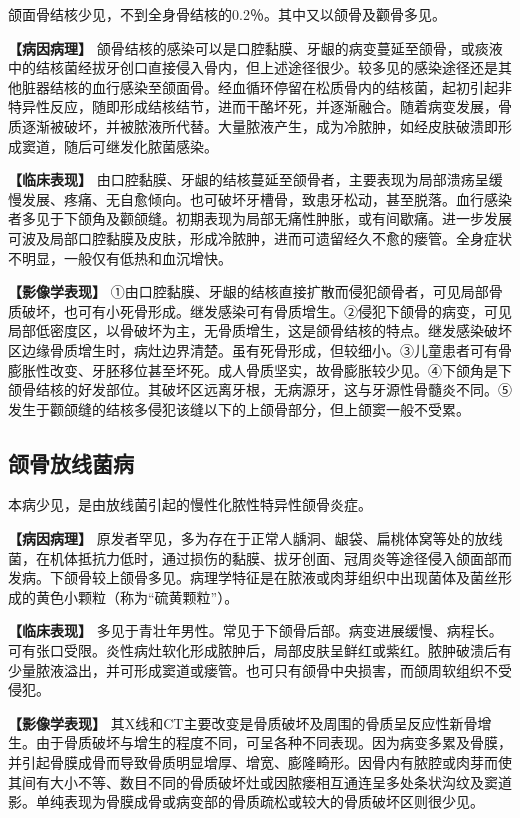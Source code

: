 颌面骨结核少见，不到全身骨结核的0.2％。其中又以颌骨及颧骨多见。

\textbf{【病因病理】}
颌骨结核的感染可以是口腔黏膜、牙龈的病变蔓延至颌骨，或痰液中的结核菌经拔牙创口直接侵入骨内，但上述途径很少。较多见的感染途径还是其他脏器结核的血行感染至颌面骨。经血循环停留在松质骨内的结核菌，起初引起非特异性反应，随即形成结核结节，进而干酪坏死，并逐渐融合。随着病变发展，骨质逐渐被破坏，并被脓液所代替。大量脓液产生，成为冷脓肿，如经皮肤破溃即形成窦道，随后可继发化脓菌感染。

\textbf{【临床表现】}
由口腔黏膜、牙龈的结核蔓延至颌骨者，主要表现为局部溃疡呈缓慢发展、疼痛、无自愈倾向。也可破坏牙槽骨，致患牙松动，甚至脱落。血行感染者多见于下颌角及颧颌缝。初期表现为局部无痛性肿胀，或有间歇痛。进一步发展可波及局部口腔黏膜及皮肤，形成冷脓肿，进而可遗留经久不愈的瘘管。全身症状不明显，一般仅有低热和血沉增快。

\textbf{【影像学表现】}
①由口腔黏膜、牙龈的结核直接扩散而侵犯颌骨者，可见局部骨质破坏，也可有小死骨形成。继发感染可有骨质增生。②侵犯下颌骨的病变，可见局部低密度区，以骨破坏为主，无骨质增生，这是颌骨结核的特点。继发感染破坏区边缘骨质增生时，病灶边界清楚。虽有死骨形成，但较细小。③儿童患者可有骨膨胀性改变、牙胚移位甚至坏死。成人骨质坚实，故骨膨胀较少见。④下颌角是下颌骨结核的好发部位。其破坏区远离牙根，无病源牙，这与牙源性骨髓炎不同。⑤发生于颧颌缝的结核多侵犯该缝以下的上颌骨部分，但上颌窦一般不受累。

\subsection{颌骨放线菌病}

本病少见，是由放线菌引起的慢性化脓性特异性颌骨炎症。

\textbf{【病因病理】}
原发者罕见，多为存在于正常人龋洞、龈袋、扁桃体窝等处的放线菌，在机体抵抗力低时，通过损伤的黏膜、拔牙创面、冠周炎等途径侵入颌面部而发病。下颌骨较上颌骨多见。病理学特征是在脓液或肉芽组织中出现菌体及菌丝形成的黄色小颗粒（称为“硫黄颗粒”）。

\textbf{【临床表现】}
多见于青壮年男性。常见于下颌骨后部。病变进展缓慢、病程长。可有张口受限。炎性病灶软化形成脓肿后，局部皮肤呈鲜红或紫红。脓肿破溃后有少量脓液溢出，并可形成窦道或瘘管。也可只有颌骨中央损害，而颌周软组织不受侵犯。

\textbf{【影像学表现】}
其X线和CT主要改变是骨质破坏及周围的骨质呈反应性新骨增生。由于骨质破坏与增生的程度不同，可呈各种不同表现。因为病变多累及骨膜，并引起骨膜成骨而导致骨质明显增厚、增宽、膨隆畸形。因骨内有脓腔或肉芽而使其间有大小不等、数目不同的骨质破坏灶或因脓瘘相互通连呈多处条状沟纹及窦道影。单纯表现为骨膜成骨或病变部的骨质疏松或较大的骨质破坏区则很少见。

